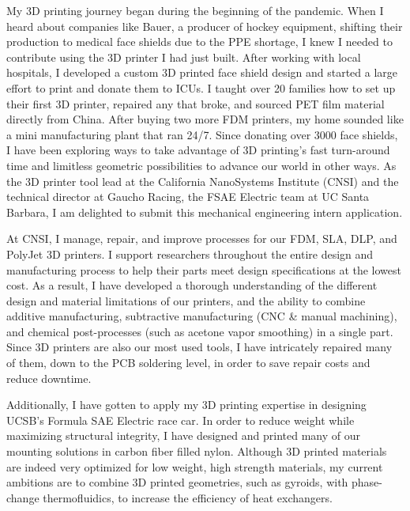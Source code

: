 \documentclass[11pt, letterpaper]{awesome-cv} %
\begin{document}
\makecvheader %

\makelettertitle %


\begin{cvletter}


My 3D printing journey began during the beginning of the pandemic. When I heard about companies like Bauer, a producer of hockey equipment, shifting their production to medical face shields due to the PPE shortage, I knew I needed to contribute using the 3D printer I had just built. After working with local hospitals, I developed a custom 3D printed face shield design and started a large effort to print and donate them to ICUs. I taught over 20 families how to set up their first 3D printer, repaired any that broke, and sourced PET film material directly from China. After buying two more FDM printers, my home sounded like a mini manufacturing plant that ran 24/7. Since donating over 3000 face shields, I have been exploring ways to take advantage of 3D printing's fast turn-around time and limitless geometric possibilities to advance our world in other ways. As the 3D printer tool lead at the California NanoSystems Institute (CNSI) and the technical director at Gaucho Racing, the FSAE Electric team at UC Santa Barbara, I am delighted to submit this mechanical engineering intern application.

At CNSI, I manage, repair, and improve processes for our FDM, SLA, DLP, and PolyJet 3D printers. I support researchers throughout the entire design and manufacturing process to help their parts meet design specifications at the lowest cost. As a result, I have developed a thorough understanding of the different design and material limitations of our printers, and the ability to combine additive manufacturing, subtractive manufacturing (CNC \& manual machining), and chemical post-processes (such as acetone vapor smoothing) in a single part. Since 3D printers are also our most used tools, I have intricately repaired many of them, down to the PCB soldering level, in order to save repair costs and reduce downtime. 

Additionally, I have gotten to apply my 3D printing expertise in designing UCSB's Formula SAE Electric race car. In order to reduce weight while maximizing structural integrity, I have designed and printed many of our mounting solutions in carbon fiber filled nylon. Although 3D printed materials are indeed very optimized for low weight, high strength materials, my current ambitions are to combine 3D printed geometries, such as gyroids, with phase-change thermofluidics, to increase the efficiency of heat exchangers.


\end{cvletter}
\end{document}
